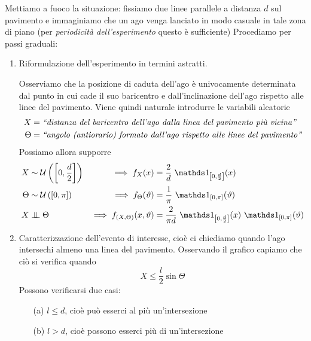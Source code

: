 \Soluzione{}
Mettiamo a fuoco la situazione: fissiamo due linee parallele a distanza $d$ sul pavimento e immaginiamo che un ago venga lanciato in modo casuale in tale zona di piano (per \emph{periodicità dell'esperimento} questo è sufficiente)
Procediamo per passi graduali:
\begin{enumerate}

\item Riformulazione dell'esperimento in termini astratti.

Osserviamo che la posizione di caduta dell'ago è univocamente determinata dal punto in cui cade il suo baricentro e dall'inclinazione dell'ago rispetto alle linee del pavimento. Viene quindi naturale introdurre le variabili aleatorie
\begin{gather*}
\begin{aligned}
X&=\emph{``distanza del baricentro dell'ago dalla linea del pavimento più vicina''}\\
\Theta &=\emph{``angolo (antiorario) formato dall'ago rispetto alle linee del pavimento''}
\end{aligned}
\end{gather*}
Possiamo allora supporre
\begin{align*}
X&\sim\Uc\left(\left[0,\frac{d}{2}\right]\right) &\implies f_X(x)&=\frac{2}{d}\ \Ind_{\left[0,\frac{d}{2}\right]}(x) \\
\Theta&\sim\Uc\left(\left[0,\pi\right]\right) &\implies f_\Theta(\vartheta)&=\frac{1}{\pi}\ \Ind_{\left[0,\pi\right]}(\vartheta) \\
X&\indep\Theta&\implies f_{(X,\Theta)}(x,\vartheta)&=\frac{2}{\pi d}\ \Ind_{\left[0,\frac{d}{2}\right]}(x)\ \Ind_{\left[0,\pi\right]}(\vartheta)
\end{align*}

\item Caratterizzazione dell'evento di interesse, cioè ci chiediamo quando l'ago intersechi almeno una linea del pavimento.
Osservando il grafico capiamo che ciò si verifica quando
\[
\boxed{X\leq\frac{l}{2}\sin\Theta}
\]
Possono verificarsi due casi:
\begin{enumerate}

\item [(a)] $l\leq d$, cioè può esserci al più un'intersezione

\item [(b)] $l>d$, cioè possono esserci più di un'intersezione

\end{enumerate}


\end{enumerate}
